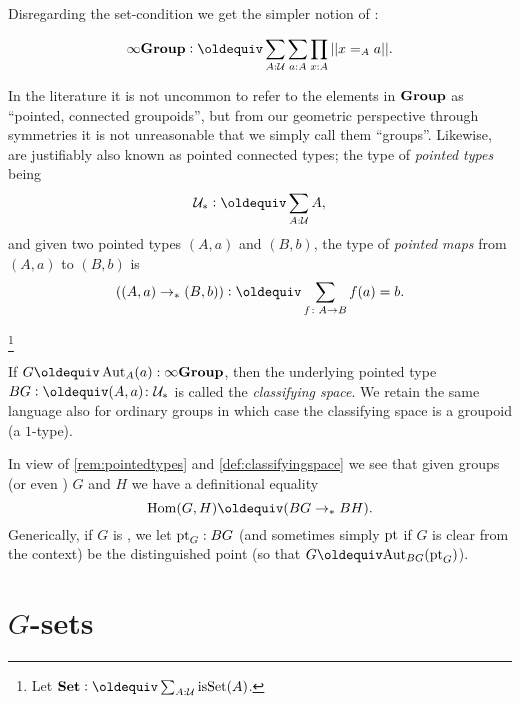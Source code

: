 \section{\inftygps}
\label{sec:inftygps}

Disregarding the set-condition we get the simpler notion of \inftygps:
\begin{definition}
  $$\typeinftygp\defequi \sum_{A:\mathcal U}\sum_{a:A}\prod_{x:A}||x=_Aa||.$$
\end{definition}

\begin{remark}\label{rem:pointedtypes}
  In the literature it is not uncommon to refer to the elements in $\mathbf{Group}$ as ``pointed, connected groupoids'', but from our geometric perspective through symmetries it is not unreasonable that we simply call them ``groups''.  Likewise, \inftygps are justifiably also known as pointed connected types;  the type of \emph{pointed types} being
$$\pttype\defequi\sum_{A:\mathcal U}A,$$
and given two pointed types $(A,a)$ and $(B,b)$, the type of \emph{pointed maps} from $(A,a)$ to $(B,b)$ is
$$((A,a)\to_*(B,b))\defequi\sum_{f\colon A\to B}f(a)=b.$$
\end{remark}


\footnote{Let $\typeset\defequi \sum_{A:\mathcal U}\isset(A)$.}
\begin{definition}\label{def:classifyingspace}
  If $G\oldequiv\Aut_A(a):\typeinftygp$, then the underlying pointed type $BG\defequi (A,a)\colon\pttype$ is called the  \emph{classifying space}.  We retain the same language also for ordinary groups in which case the classifying space is a groupoid (\ie a $1$-type).   %
\end{definition}
\begin{remark}
  In view of \cref{rem:pointedtypes} and \cref{def:classifyingspace} we see that given groups (or even \inftygps) $G$ and $H$ we have a definitional equality
$$\Hom(G,H)\oldequiv(BG\to_*BH).$$
Generically, if $G$ is \aninftygp, we let ${\mathord{\mathrm{pt}}}_G:BG$ (and sometimes simply ${\mathord{\mathrm{pt}}}$ if $G$ is clear from the context) be the distinguished point (so that $G\oldequiv\aut_{BG}(\pt_G)$).
\end{remark}





\section{$G$-sets}
\label{sec:gsets}

